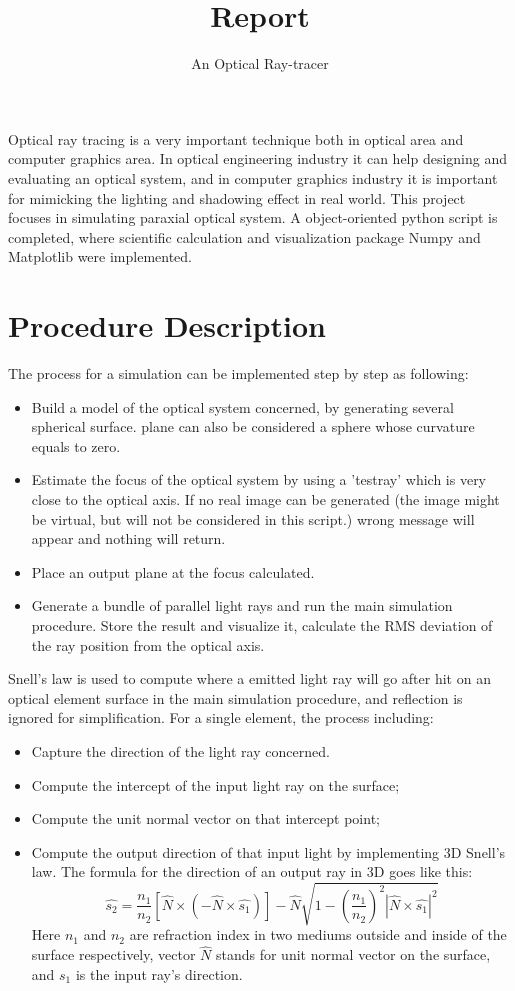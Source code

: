 \documentclass[12pt,a4paper]{article}
\title{Report}
\author{An Optical Ray-tracer}
\begin{document}
\maketitle

Optical ray tracing is a very important technique both in optical area and computer graphics area. In optical engineering industry it can help designing and evaluating an optical system, and in computer graphics industry it is important for mimicking the lighting and shadowing effect in real world. This project focuses in simulating paraxial optical system. A object-oriented python script is completed, where scientific calculation and visualization package Numpy and Matplotlib were implemented.
\section{Procedure Description}
The process for a simulation can be implemented step by step as following:
\begin{itemize}
\item Build a model of the optical system concerned, by generating several spherical surface. plane can also be considered a sphere whose curvature equals to zero.
\item Estimate the focus of the optical system by using a 'testray' which is very close to the optical axis. If no real image can be generated (the image might be virtual, but will not be considered in this script.) wrong message will appear and nothing will return.
\item Place an output plane at the focus calculated.
\item Generate a bundle of parallel light rays and run the main simulation procedure.
Store the result and visualize it, calculate the RMS deviation of the ray position from the optical axis.
\end{itemize}

Snell's law is used to compute where a emitted light ray will go after hit on an optical element surface in the main simulation procedure, and reflection is ignored for simplification. For a single element, the process including:
\begin{itemize}
\item Capture the direction of the light ray concerned.
\item Compute the intercept of the input light ray on the surface;
\item Compute the unit normal vector on that intercept point;
\item Compute the output direction of that input light by implementing 3D Snell's law. The formula for the direction of an output ray in 3D goes like this:
$$\hat{s_2}=\frac{n_1}{n_2}[\hat{N}\times(-\hat{N}\times\hat{s_1})]-\hat{N}\sqrt{1-(\frac{n_1}{n_2})^2|\hat{N}\times\hat{s_1}|^2}$$
Here $n_1$ and $n_2$ are refraction index in two mediums outside and inside of the surface respectively, vector $\hat{N}$ stands for unit normal vector on the surface, and $s_1$ is the input ray's direction.
\end{itemize}
\end{document}

